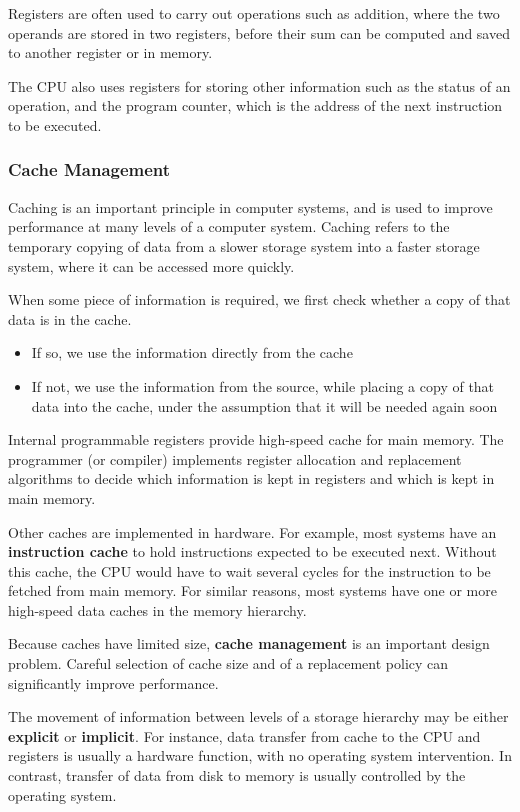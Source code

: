 \documentclass{article}
\begin{document}
Registers are often used to carry out operations such as addition,
where the two operands are stored in two registers, before their sum
can be computed and saved to another register or in memory.

The CPU also uses registers for storing other information such as the
status of an operation, and the program counter, which is the address
of the next instruction to be executed.
\subsubsection{Cache Management}
Caching is an important principle in computer systems, and is used to
improve performance at many levels of a computer system. Caching refers
to the temporary copying of data from a slower storage system into a
faster storage system, where it can be accessed more quickly.

When some piece of information is required, we first check whether a
copy of that data is in the cache.
\begin{itemize}
    \item If so, we use the information directly from the cache
    \item If not, we use the information from the source, while placing
          a copy of that data into the cache, under the assumption that
          it will be needed again soon
\end{itemize}
Internal programmable registers provide high-speed cache for main
memory.
The programmer (or compiler) implements register allocation and
replacement algorithms to decide which information is kept in registers
and which is kept in main memory.

Other caches are implemented in hardware. For example, most systems
have an \textbf{instruction cache} to hold instructions expected to be
executed next. Without this cache, the CPU would have to wait several
cycles for the instruction to be fetched from main memory. For similar
reasons, most systems have one or more high-speed data caches in the
memory hierarchy.

Because caches have limited size, \textbf{cache management} is an
important design problem. Careful selection of cache size and of a
replacement policy can significantly improve performance.

The movement of information between levels of a storage hierarchy may
be either \textbf{explicit} or \textbf{implicit}. For instance, data
transfer from cache to the CPU and registers is usually a hardware
function, with no operating system intervention. In contrast, transfer
of data from disk to memory is usually controlled by the operating
system.
\end{document}
